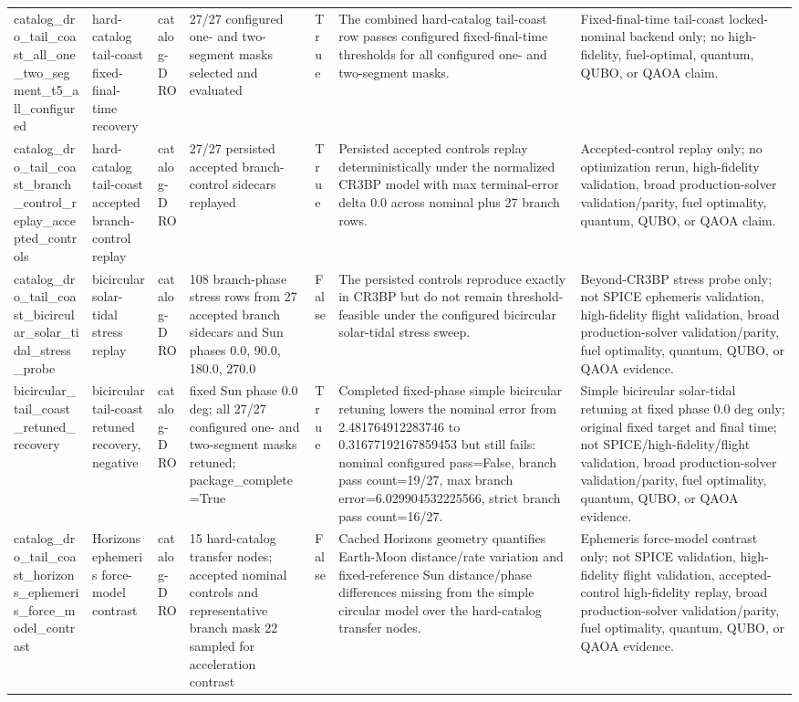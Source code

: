 \begin{tabular}{lllllll}
catalog\_dro\_tail\_coast\_all\_one\_two\_segment\_t5\_all\_configured & hard-catalog tail-coast fixed-final-time recovery & catalog-DRO & 27/27 configured one- and two-segment masks selected and evaluated & True & The combined hard-catalog tail-coast row passes configured fixed-final-time thresholds for all configured one- and two-segment masks. & Fixed-final-time tail-coast locked-nominal backend only; no high-fidelity, fuel-optimal, quantum, QUBO, or QAOA claim. \\
catalog\_dro\_tail\_coast\_branch\_control\_replay\_accepted\_controls & hard-catalog tail-coast accepted branch-control replay & catalog-DRO & 27/27 persisted accepted branch-control sidecars replayed & True & Persisted accepted controls replay deterministically under the normalized CR3BP model with max terminal-error delta 0.0 across nominal plus 27 branch rows. & Accepted-control replay only; no optimization rerun, high-fidelity validation, broad production-solver validation/parity, fuel optimality, quantum, QUBO, or QAOA claim. \\
catalog\_dro\_tail\_coast\_bicircular\_solar\_tidal\_stress\_probe & bicircular solar-tidal stress replay & catalog-DRO & 108 branch-phase stress rows from 27 accepted branch sidecars and Sun phases 0.0, 90.0, 180.0, 270.0 & False & The persisted controls reproduce exactly in CR3BP but do not remain threshold-feasible under the configured bicircular solar-tidal stress sweep. & Beyond-CR3BP stress probe only; not SPICE ephemeris validation, high-fidelity flight validation, broad production-solver validation/parity, fuel optimality, quantum, QUBO, or QAOA evidence. \\
bicircular\_tail\_coast\_retuned\_recovery & bicircular tail-coast retuned recovery, negative & catalog-DRO & fixed Sun phase 0.0 deg; all 27/27 configured one- and two-segment masks retuned; package\_complete=True & True & Completed fixed-phase simple bicircular retuning lowers the nominal error from 2.481764912283746 to 0.31677192167859453 but still fails: nominal configured pass=False, branch pass count=19/27, max branch error=6.029904532225566, strict branch pass count=16/27. & Simple bicircular solar-tidal retuning at fixed phase 0.0 deg only; original fixed target and final time; not SPICE/high-fidelity/flight validation, broad production-solver validation/parity, fuel optimality, quantum, QUBO, or QAOA evidence. \\
catalog\_dro\_tail\_coast\_horizons\_ephemeris\_force\_model\_contrast & Horizons ephemeris force-model contrast & catalog-DRO & 15 hard-catalog transfer nodes; accepted nominal controls and representative branch mask 22 sampled for acceleration contrast & False & Cached Horizons geometry quantifies Earth-Moon distance/rate variation and fixed-reference Sun distance/phase differences missing from the simple circular model over the hard-catalog transfer nodes. & Ephemeris force-model contrast only; not SPICE validation, high-fidelity flight validation, accepted-control high-fidelity replay, broad production-solver validation/parity, fuel optimality, quantum, QUBO, or QAOA evidence. \\

\end{tabular}
